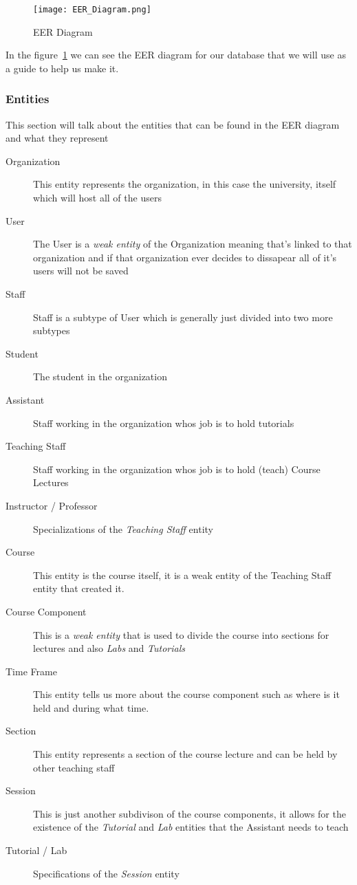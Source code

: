 \documentclass[a4paper, 12pt]{article}
\begin{document}
      \begin{figure}[h]
        \centering
        \texttt{[image: EER\_Diagram.png]}
        \caption{EER Diagram}

        \label{fig:eer-diagram}
      \end{figure}

      \newpage

      \noindent In the figure~\ref{fig:eer-diagram} we can see the EER diagram for our database that we will use as a guide to help us make it.

      \subsubsection{Entities}
        \noindent This section will talk about the entities that can be found in the EER diagram and what they represent
        \vspace{1mm}
        \begin{description}
          \item[Organization] This entity represents the organization, in this case the university, itself which will host all of the users
          \item[User] The User is a \emph{weak entity} of the Organization meaning that's linked to that organization and if that organization ever decides to dissapear all of it's users will not be saved 
          \item[Staff] Staff is a subtype of User which is generally just divided into two more subtypes
          \item[Student] The student in the organization
          \item[Assistant] Staff working in the organization whos job is to hold tutorials
          \item[Teaching Staff] Staff working in the organization whos job is to hold (teach) Course Lectures
          \item[Instructor / Professor] Specializations of the \emph{Teaching Staff} entity
          \item[Course] This entity is the course itself, it is a weak entity of the Teaching Staff entity that created it.
          \item[Course Component] This is a \emph{weak entity} that is used to divide the course into sections for lectures and also \emph{Labs} and \emph{Tutorials}
          \item[Time Frame] This entity tells us more about the course component such as where is it held and during what time.
          \item[Section] This entity represents a section of the course lecture and can be held by other teaching staff
          \item[Session] This is just another subdivison of the course components, it allows for the existence of the \emph{Tutorial} and \emph{Lab} entities that the Assistant needs to teach
          \item [Tutorial / Lab] Specifications of the \emph{Session} entity
        \end{description}
      
\end{document}
